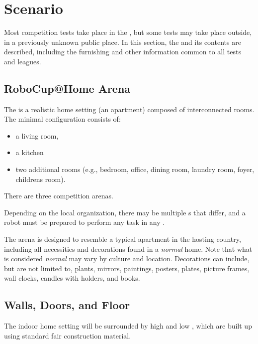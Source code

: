 \section{Scenario}\label{sec:scenario}

Most competition tests take place in the \RoboCup\AtHome{} \Arena, but some tests may take place outside, in a previously unknown public place.
In this section, the \Arena{} and its contents are described, including the furnishing and other information common to all tests and leagues.

\subsection{RoboCup@Home Arena}

The \RoboCup\AtHome\Arena{} is a realistic home setting (an apartment) composed of interconnected rooms.
The minimal configuration consists of:
\begin{itemize}
	\item a living room,
	\item a kitchen
	\item two additional rooms (e.g., bedroom, office, dining room, laundry room, foyer, childrens room).
\end{itemize}
There are three competition arenas.

Depending on the local organization, there may be multiple \Arena{}s that differ, and a robot must be prepared to perform any task in any \Arena{}.

The arena is designed to resemble a typical apartment in the hosting country, including all necessities and decorations found in a \emph{normal} home.
Note that what is considered \emph{normal} may vary by culture and location.
Decorations can include, but are not limited to, plants, mirrors, paintings, posters, plates, picture frames, wall clocks, candles with holders, and books.

\subsection{Walls, Doors, and Floor}\label{rule:scenario_walls}

The indoor home setting will be surrounded by high and low , which are built up using standard fair construction material.


